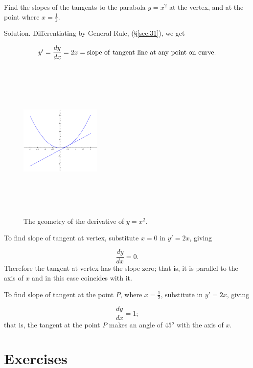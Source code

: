 \begin{example}
{\rm
Find the slopes of the tangents to the parabola $y = x^2$ at the vertex, 
and at the point where $x = \frac{1}{2}$.

Solution. Differentiating by General Rule, %
(\S \ref{sec:31}), we get

\[
y' = \frac{dy}{dx} = 2x = {\rm slope\ of\ tangent\ line\ at\ any\ point\ on\ curve}.
\]

\begin{figure}[h!]
\begin{minipage}{\textwidth}
\begin{center}
\includegraphics[height=8cm,width=4cm]{deriv-x2.eps}
\end{center}
\end{minipage}
\caption{The geometry of the derivative of $y=x^2$.}
\label{fig:x2}
\end{figure}

To find slope of tangent at vertex, substitute $x = 0$ in %
$y'=2x$, giving

\[
    \frac{dy}{dx} = 0.
\]
Therefore the tangent at vertex has the slope zero; that is, it is 
parallel to the axis of 
$x$ and in this case coincides with it.

To find slope of tangent at the point $P$, where $x = \frac{1}{2}$, 
substitute in %
$y'=2x$, giving

\[
    \frac{dy}{dx} = 1;
\]
that is, the tangent at the point $P$ makes an angle of $45^o$ with 
the axis of $x$.
}
\end{example}

\section{Exercises}

